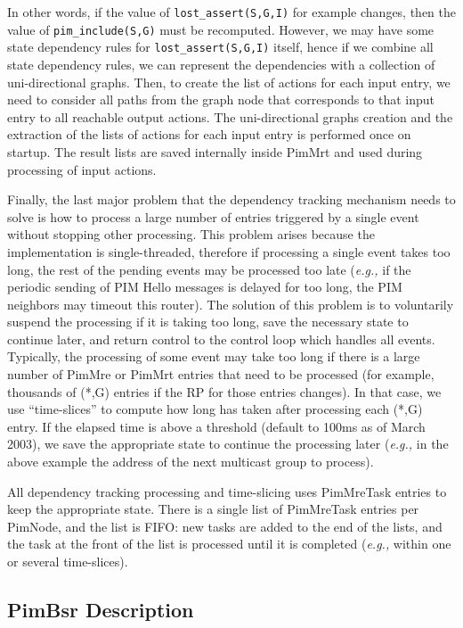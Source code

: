 \documentclass[11pt]{article}
\newcommand{\eg}{\emph{e.g.,}\xspace}
\begin{document}
In other words, if the value of \verb=lost_assert(S,G,I)= for example changes,
then the value of \verb=pim_include(S,G)= must be recomputed.
However, we may have some state dependency rules for
\verb=lost_assert(S,G,I)= itself, hence if we combine all state
dependency rules, we can represent the dependencies with a collection
of uni-directional graphs. Then, to create the list of actions for each
input entry, we need to consider all paths from the graph node that
corresponds to that input entry to all reachable output actions.
The uni-directional graphs creation and the extraction of the lists of
actions for each input entry is performed once on startup. The result
lists are saved internally inside PimMrt and used during processing of
input actions.

Finally, the last major problem that the dependency tracking mechanism
needs to solve is how to process a large number of entries triggered by
a single event without stopping other processing. This problem arises
because the implementation is single-threaded, therefore if processing a
single event takes too long, the rest of the pending events may
be processed too late (\eg if the periodic sending of PIM Hello messages
is delayed for too long, the PIM neighbors may timeout this
router). The solution of this problem is to voluntarily suspend
the processing if it is taking too long, save the necessary state
to continue later, and return control to the control loop which
handles all events. Typically, the processing of some event may take too
long if there is a large number of PimMre or PimMrt entries that
need to be processed (for example, thousands of (*,G) entries if the RP
for those entries changes). In that case, we use ``time-slices'' to
compute how long has taken after processing each (*,G) entry. If the
elapsed time is above a threshold (default to 100ms as of March
2003), we save the appropriate state to continue the processing later
(\eg in the above example the address of the next multicast group to
process).

All dependency tracking processing and time-slicing uses PimMreTask
entries to keep the appropriate state. There is a single list of
PimMreTask entries per PimNode, and the list is FIFO: new tasks are
added to the end of the lists, and the task at the front of the list is
processed until it is completed (\eg within one or several time-slices).

\subsection{PimBsr Description}
\end{document}
